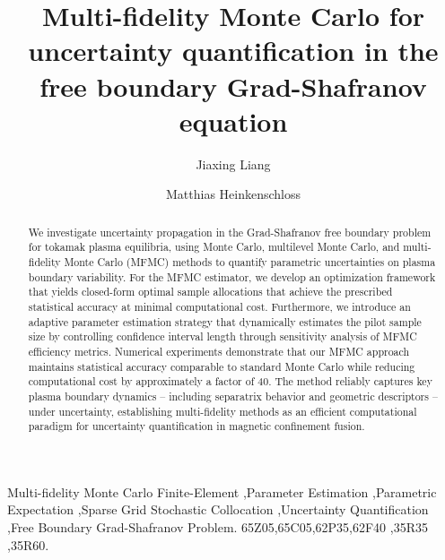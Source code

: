 \documentclass[final,3p,times,11pt]{elsarticle}
\begin{document}
\begin{frontmatter}
\title{Multi-fidelity Monte Carlo for uncertainty quantification in the free boundary Grad-Shafranov equation}


\author[umds]{Jiaxing Liang}
\address[umds]{Department of Computational Applied Mathematics \& Operations Research, Rice University.}
\author[umdcm]{Matthias Heinkenschloss}
\address[umdcm]{Department of Computational Applied Mathematics \& Operations Research and The Ken Kennedy Institute, Rice  University.}

\begin{abstract}
We investigate uncertainty propagation in the Grad-Shafranov free boundary problem for tokamak plasma equilibria, using Monte Carlo, multilevel Monte Carlo, and multi-fidelity Monte Carlo (MFMC) methods to quantify parametric uncertainties on plasma boundary variability. For the MFMC estimator, we develop an optimization framework that yields closed-form optimal sample allocations that achieve the prescribed statistical accuracy at minimal computational cost. Furthermore, we introduce an adaptive parameter estimation strategy that dynamically estimates the pilot sample size by controlling confidence interval length through sensitivity analysis of MFMC efficiency metrics. Numerical experiments demonstrate that our MFMC approach maintains statistical accuracy comparable to standard Monte Carlo while reducing computational cost by approximately a factor of 40. The method reliably captures key plasma boundary dynamics -- including separatrix behavior and geometric descriptors -- under uncertainty, establishing multi-fidelity methods as an efficient computational paradigm for uncertainty quantification in magnetic confinement fusion.  
\end{abstract}

\begin{keyword}
Multi-fidelity Monte Carlo Finite-Element \sep Parameter Estimation \sep Parametric Expectation \sep Sparse Grid Stochastic Collocation \sep Uncertainty Quantification \sep Free Boundary Grad-Shafranov Problem.
%
\MSC[2020] 65Z05\sep 65C05\sep 62P35\sep 62F40 \sep 35R35 \sep 35R60.
\end{keyword}
\end{frontmatter}

 
 












% 

\end{document}
